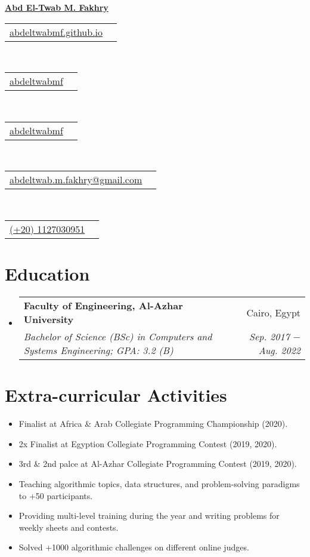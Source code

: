 \documentclass[letterpaper, 11pt]{article}
\makeatletter
\newcommand{\education}[5] {
  \vspace{-1pt}\item
  \begin{tabular*}{0.97\textwidth}[t]{l@{\extracolsep{\fill}}r}
    #1 \textbf{#2} & #3 \\
    \textit{\small #4} & \textit{\small #5} \\
  \end{tabular*}
  \vspace{-4pt}
}
\newcommand{\extracurricularactivity}[5] {
\item\small
  {#1}
  \href{#2}{\color{RoyalBlue}#3}
  \href{#4}{\color{RoyalBlue}#5}
  \vspace{-4pt}
}
\newcommand{\name}[2] {
  \textbf{
    \href{#1}{\Huge{#2}}
  }
  \vspace{-8pt}
}
\newcommand{\contact}[4] {
  \begin{tabular}{lr}
    {\href{#1}{\color{#3} #2 #4}}
  \end{tabular}
  \vspace{-4pt}
}
\makeatother
\begin{document}
\name{https://abdeltwabmf.github.io}{Abd El-Twab M. Fakhry}

\begin{center}
  \small
  \contact
  {https://abdeltwabmf.github.io}
  {\faIcon{globe}}{RoyalBlue}{abdeltwabmf.github.io}\,
  \contact
  {https://www.linkedin.com/in/abdeltwabmf}
  {\faIcon{linkedin}}{RoyalBlue}{abdeltwabmf}\,
  \contact
  {https://github.com/AbdeltwabMF}
  {\faIcon{github}}{RoyalBlue}{abdeltwabmf}\,
  \contact
  {mailto:abdeltwab.m.fakhry@gmail.com}
  {\faIcon{envelope}}{RoyalBlue}{abdeltwab.m.fakhry@gmail.com}\,
  \contact
  {tel:+201127030951}
  {\faIcon{mobile-alt}}{RoyalBlue}{(+20) 1127030951}
\end{center}\vspace{8pt}

\section{Education}
\begin{itemize}[leftmargin=*]
  \education
  {\faIcon{university}}
  {Faculty of Engineering, Al-Azhar University}{ Cairo, Egypt}
  {Bachelor of Science (BSc) in Computers and Systems Engineering; GPA: 3.2 (B)}{ Sep. 2017 $-$ Aug. 2022}
\end{itemize}

\section{Extra-curricular Activities}
\begin{itemize}[leftmargin=*]
  \extracurricularactivity
  {Finalist at Africa \& Arab Collegiate Programming Championship (2020).}
  {https://icpc.global/ICPCID/S6R4YNB7PW7D}{\faIcon{link}}
  {https://drive.google.com/drive/folders/1u0_mdcJPAfc0o91xwnp9Y6JB8VDaY82e?usp=sharing}{}

  \extracurricularactivity
  {2x Finalist at Egyption Collegiate Programming Contest (2019, 2020).}
  {https://icpc.global/ICPCID/S6R4YNB7PW7D}{\faIcon{link}}
  {https://drive.google.com/drive/folders/1sjyZmHKeBmR2DB61ZGpJkiW17wtIWQ4q?usp=sharing}{}

  \extracurricularactivity
  {3rd \& 2nd palce at Al-Azhar Collegiate Programming Contest (2019, 2020).}
  {https://icpc.global/ICPCID/S6R4YNB7PW7D}{\faIcon{link}}
  {https://drive.google.com/drive/folders/18H79Bq42ARKxvx-H1pANSZgdD57EJMYF?usp=sharing}{}

  \extracurricularactivity
  {Teaching algorithmic topics, data structures, and problem-solving paradigms to +50 participants.}
  {https://sites.google.com/view/azharicpc/home}{}
  {}{}

  \extracurricularactivity
  {Providing multi-level training during the year and writing problems for weekly sheets and contests.}
  {https://sites.google.com/view/azharicpc/home}{}
  {}{}

  \extracurricularactivity
  {Solved +1000 algorithmic challenges on different online judges.}
  {https://github.com/AbdeltwabMF/online-judge-submissions-parser}{\faIcon{link}}
  {}{}
\end{itemize}
\end{document}
